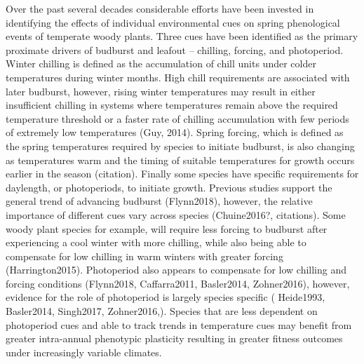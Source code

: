 \documentclass{article}\usepackage[]{graphicx}\usepackage[]{color}
\begin{document}
Over the past several decades considerable efforts have been invested in identifying the effects of individual environmental cues on spring phenological events of temperate woody plants. Three cues have been identified as the primary proximate drivers of budburst and leafout -- chilling, forcing, and photoperiod. Winter chilling is defined as the accumulation of chill units under colder temperatures during winter months. High chill requirements are associated with later budburst, however, rising winter temperatures may result in either insufficient chilling in systems where temperatures remain above the required temperature threshold or a faster rate of chilling accumulation with few periods of extremely low temperatures (Guy, 2014). Spring forcing, which is defined as the spring temperatures required by species to initiate budburst, is also changing as temperatures warm and the timing of suitable temperatures for growth occurs earlier in the season (citation). Finally some species have specific requirements for daylength, or photoperiods, to initiate growth. Previous studies support the general trend of advancing budburst (Flynn2018), however, the relative importance of different cues vary across species (Chuine2016?, citations). Some woody plant species for example, will require less forcing to budburst after experiencing a cool winter with more chilling, while also being able to compensate for low chilling in warm winters with greater forcing (Harrington2015). Photoperiod also appears to compensate for low chilling and forcing conditions (Flynn2018,  Caffarra2011, Basler2014,  Zohner2016), however, evidence for the role of photoperiod is largely species specific ( Heide1993, Basler2014, Singh2017, Zohner2016,). Species that are less dependent on photoperiod cues and able to track trends in temperature cues may benefit from greater intra-annual phenotypic plasticity resulting in greater fitness outcomes under increasingly variable climates. 
\end{document}
